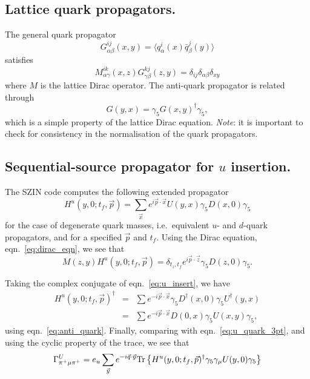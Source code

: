 \documentclass[12pt]{article}
\newcommand{\pdotx}{\vec{p} \cdot \vec{x}}
\newcommand{\pdotz}{\vec{p} \cdot \vec{z}}
\newcommand{\qdoty}{\vec{q} \cdot \vec{y}}
\begin{document}
\subsection{Lattice quark propagators.}
The general quark propagator
\begin{equation}
G^{ij}_{\alpha\beta}(x,y) = \langle q^i_{\alpha}(x)
\bar{q}^j_{\beta}(y)\rangle
\end{equation}
satisfies
\begin{equation}
M^{ik}_{\alpha\gamma}(x,z) G^{kj}_{\gamma\beta}(z,y) = \delta_{ij}
\delta_{\alpha \beta} \delta_{xy}\label{eq:dirac_eqn}
\end{equation}
where $M$ is the lattice Dirac operator.  The anti-quark propagator
is related through
\begin{equation}
G(y,x) = \gamma_5 G(x,y)^{\dagger} \gamma_5,\label{eq:anti_quark}
\end{equation}
which is a simple property of the lattice Dirac equation.
\textit{Note}: it is important to check for consistency in the
normalisation of the quark propagators.

\subsection{Sequential-source propagator for $u$ insertion.}
The SZIN code computes the following extended propagator
\begin{equation}
H^u (y,0; t_f, \vec{p}) = \sum_{\vec{x}} e^{i \pdotx} U(y,x) \gamma_5 D(x,0) \gamma_5\label{eq:u_insert}
\end{equation}
for the case of degenerate quark masses, i.e.\ equivalent $u$- and
$d$-quark propagators, and for a specified $\vec{p}$ and $t_f$.  Using
the Dirac equation, eqn.~\ref{eq:dirac_eqn}, we see that
\begin{equation}
M(z,y) H^u(y,0; t_f, \vec{p}) = \delta_{t_z, t_f} e^{i
  \pdotz} \gamma_5 D(z,0) \gamma_5.
  \label{eq:dirac_u_insert}
\end{equation}

Taking the complex conjugate of eqn.~\ref{eq:u_insert}, we have 
\begin{eqnarray}
H^u (y,0; t_f, \vec{p})^{\dagger} & = & \sum e^{-i\pdotx}\gamma_5
D^{\dagger}(x,0)\gamma_5 U^{\dagger}(y,x)\nonumber\\
& = & \sum e^{-i\pdotx} D(0,x) \gamma_5 U(x,y) \gamma_5,
\end{eqnarray}
using eqn.~\ref{eq:anti_quark}.  Finally, comparing with
eqn.~\ref{eq:u_quark_3pt}, and using the cyclic property of the trace,
we see that
\begin{equation}
\Gamma_{\pi^+ \mu \pi^+}^U = e_u \sum_{\vec{y}} e^{-i \qdoty} {\rm Tr}
\left\{ H^u(y,0; t_f, \vec{p})^{\dagger} \gamma_5 \gamma_{\mu} U(y,0)
\gamma_5\right\} \label{eq:u_quark_3pt_final}
\end{equation}
\end{document}
